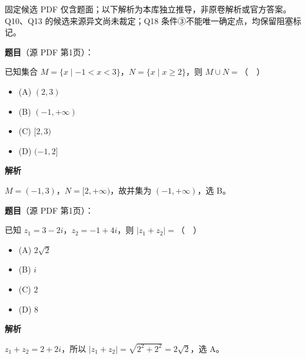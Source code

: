 

\begin{gktip}
固定候选 PDF 仅含题面；以下解析为本库独立推导，非原卷解析或官方答案。Q10、Q13 的候选来源异文尚未裁定；Q18 条件③不能唯一确定点，均保留阻塞标记。
\end{gktip}


\begin{answer}

\textbf{题目}（源 PDF 第1页）：

已知集合 \(M=\{x\mid -1<x<3\}\)，\(N=\{x\mid x\geq 2\}\)，则 \(M\cup N=\)（　）

\begin{itemize}
\item (A) \((2,3)\)
\item (B) \((-1,+\infty)\)
\item (C) \([2,3)\)
\item (D) \((-1,2]\)
\end{itemize}

\textbf{解析}

\(M=(-1,3)\)，\(N=[2,+\infty)\)，故并集为 \((-1,+\infty)\)，选 B。


\end{answer}
\begin{answer}

\textbf{题目}（源 PDF 第1页）：

已知 \(z_1=3-2i\)，\(z_2=-1+4i\)，则 \(\lvert z_1+z_2\rvert=\)（　）

\begin{itemize}
\item (A) \(2\sqrt{2}\)
\item (B) \(i\)
\item (C) \(2\)
\item (D) \(8\)
\end{itemize}

\textbf{解析}

\(z_1+z_2=2+2i\)，所以 \(|z_1+z_2|=\sqrt{2^2+2^2}=2\sqrt2\)，选 A。


\end{answer}
